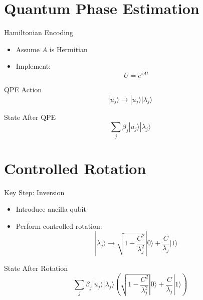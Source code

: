 \documentclass{beamer}
\begin{document}
\section{Quantum Phase Estimation}

\begin{frame}{Hamiltonian Encoding}
\begin{itemize}
\item Assume $A$ is Hermitian
\item Implement:
\[
U = e^{iAt}
\]
\end{itemize}
\end{frame}


\begin{frame}{QPE Action}
\[
|u_j\rangle \rightarrow |u_j\rangle |\lambda_j\rangle
\]
\end{frame}


\begin{frame}{State After QPE}
\[
\sum_j \beta_j |u_j\rangle |\lambda_j\rangle
\]
\end{frame}

\section{Controlled Rotation}

\begin{frame}{Key Step: Inversion}
\begin{itemize}
\item Introduce ancilla qubit
\item Perform controlled rotation:
\[
|\lambda_j\rangle \rightarrow
\sqrt{1-\frac{C^2}{\lambda_j^2}}|0\rangle +
\frac{C}{\lambda_j}|1\rangle
\]
\end{itemize}
\end{frame}


\begin{frame}{State After Rotation}
\[
\sum_j \beta_j |u_j\rangle |\lambda_j\rangle
\left(
\sqrt{1-\frac{C^2}{\lambda_j^2}}|0\rangle +
\frac{C}{\lambda_j}|1\rangle
\right)
\]
\end{frame}
\end{document}
